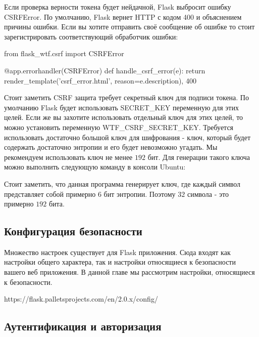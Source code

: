 Если проверка верности токена будет нейдачной, Flask выбросит ошибку CSRFError. 
По умолчанию, Flask вернет HTTP с кодом 400 и объяснением причины ошибки. Если
вы хотите отправить своё сообщение об ошибке то стоит зарегистрировать соответствующий
обработчик ошибки:

\begin{python}
from flask_wtf.csrf import CSRFError

@app.errorhandler(CSRFError)
def handle_csrf_error(e):
    return render_template('csrf_error.html', reason=e.description), 400
\end{python}

Стоит заметить CSRF защита требует секретный ключ для подписи токена. По умолчанию Flask 
будет использовать SECRET\_KEY переменную для этих целей. Если же вы захотите использовать
отдельный ключ для этих целей, то можно установить переменную WTF\_CSRF\_SECRET\_KEY.
Требуется использовать достаточно большой ключ для шифрования - ключ, который будет
содержать достаточно энтропии и его будет невозможно угадать. Мы рекомендуем использовать
ключ не менее $192$ бит. Для генерации такого ключа можно выполнить следующую команду в 
консоли Ubuntu:


Стоит заметить, что данная программа генерирует ключ, где каждый символ представляет собой
примерно $6$ бит энтропии. Поэтому $32$ символа - это примерно $192$ бита.

\subsection{Конфигурация безопасности}

Множество настроек существует для Flask приложения. Сюда входят как настройки общего характера,
так и настройки относящиеся к безопасности вашего веб приложения. В данной главе мы рассмотрим
настройки, относящиеся к безопасности.

https://flask.palletsprojects.com/en/2.0.x/config/


\subsection{Аутентификация и авторизация}


